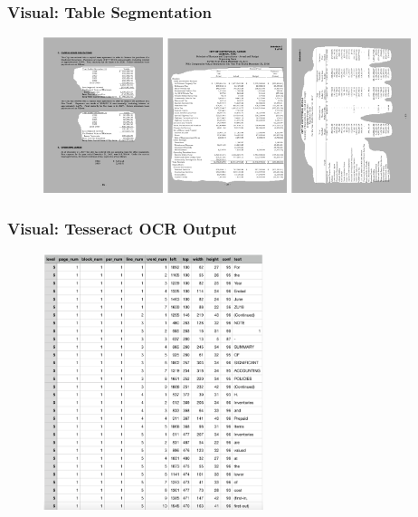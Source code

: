 \documentclass[usenames,dvipsnames]{beamer}
\begin{document}
\begin{frame}
  \frametitle{Visual: Table Segmentation}
  \begin{figure}
    \includegraphics[width=3.5cm, valign=c]{assets/mask1}
    \includegraphics[width=3.5cm, valign=c]{assets/mask2}
    \includegraphics[width=3.5cm, valign=c]{assets/mask3}
  \end{figure}
\end{frame}

\begin{frame}
  \frametitle{Visual: Tesseract OCR Output}
  \begin{figure}
    \includegraphics[height=7.5cm, valign=c]{assets/tesseract}
  \end{figure}
\end{frame}
\end{document}
